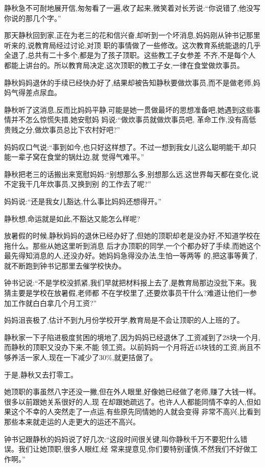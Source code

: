 ﻿\documentclass[12pt]{article}
\begin{document}
静秋急不可耐地展开信,匆匆看了一遍,收了起来,微笑着对长芳说:``你说错了,他没写你说的那几个字。''

那天静秋回到家,正在为老三的花和信兴奋,却听到一个坏消息,妈妈刚从钟书记那里听来的,说教育局经过讨论,对顶
职的事情做了一些修改。这次教育系统能退的几乎全退了,总共有二十多个,都是为了孩子顶职。这些教工子女参差
不齐,不是每个人都能上讲台的。所以教育局决定,这次顶职的教工子女,一律在食堂做炊事员。


静秋妈妈退休的手续已经快办好了,结果却被告知静秋要做炊事员,而不是做老师,妈妈气得差点尿血。

静秋听了这消息,反而比妈妈平静,可能是她一贯做最坏的思想准备吧,她遇到这些事情并不怎么惊慌失措,她安慰妈
妈说:``做炊事员就做炊事员吧, 革命工作,没有高低贵贱之分,做炊事员总比下农村好吧?''

妈妈叹口气说:``事到如今,也只好这样想了。不过一想到我女儿这么聪明能干,却只能一辈子窝在食堂的锅灶边,就
觉得气难平。''

静秋把老三的话搬出来宽慰妈妈:``别想那么多,别想那么远,这世界每天都在变化,说不定我干几年炊事员,又换到别
的工作去了呢?''

妈妈说:``还是我女儿豁达,什么事比妈妈还想得开。''

静秋想,命运就是如此,不豁达又能怎么样呢?

放暑假的时候,静秋妈妈的退休已经办好了,但她的顶职却老是没办好,不知道学校在拖什么。那些从她这里听到消息
后才办顶职的同学,一个个都办好了手续,而她这个最先得知消息的人,还没办好。她妈妈急得没办法,生怕一等两等
的,把这事等黄了,就不断跑到钟书记那里去催学校快办。

钟书记说:``不是学校没抓紧,我们早就把材料报上去了,是教育局那边没批下来。我猜主要是学校在放暑假,老师都
不在学校里了,还要炊事员干什么?难道让他们一参加工作就白白拿几个月工资?''

妈妈沮丧极了,估计不到九月份学校开学,教育局是不会让顶职的人上班的了。

静秋家一下子陷进极度贫困的境地了,因为妈妈已经退休了,工资减到了28块一个月,而静秋的顶职又没办下来,不能
领工资。以前妈妈一个月将近45块钱的工资,尚且不够养活一家人,现在一下减少了30\%,就更拮倨了。

于是,静秋又去打零工。

她顶职的事虽然八字还没一撇,但在外人眼里,好像她已经做了老师,赚了大钱一样。很多以前跟她关系很好的人,现
在却跟她疏远了。也许人人都能同情不幸的人,但如果这个不幸的人突然走了一点运,有些原先同情她的人就会变得
非常不高兴,比看到那些本来就走运的人走更大的运还不高兴。

钟书记跟静秋的妈妈说了好几次:``这段时间很关键,叫你静秋千万不要犯什么错误。我们让她顶职,很多人眼红,经
常来提意见,你们要特别谨慎,不然我们不好做工作啊。''
\end{document}
